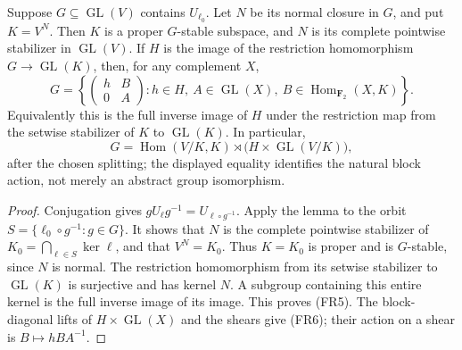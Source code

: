 \begin{proposition}
\label{prop:root-full-radical-parabolic-form}
Suppose \(G\subseteq\operatorname{GL}(V)\) contains \(U_{\ell_0}\).
Let \(N\) be its normal closure in \(G\), and put \(K=V^N\).
Then \(K\) is a proper \(G\)-stable subspace, and \(N\) is
its complete pointwise stabilizer in \(\operatorname{GL}(V)\).
If \(H\) is the image of the restriction homomorphism
\(G\to\operatorname{GL}(K)\), then, for any complement \(X\),
\[
 G=\left\{
   \begin{pmatrix}h&B\\0&A\end{pmatrix}:
   h\in H,\ A\in\operatorname{GL}(X),\
   B\in\operatorname{Hom}_{\mathbf F_2}(X,K)
       \right\}.
 \tag{FR5}
\]
Equivalently this is the full inverse image of \(H\) under the
restriction map from the setwise stabilizer of \(K\) to
\(\operatorname{GL}(K)\). In particular,
\[
 G=\operatorname{Hom}(V/K,K)\rtimes
        \bigl(H\times\operatorname{GL}(V/K)\bigr),
 \tag{FR6}
\]
after the chosen splitting; the displayed equality identifies the
natural block action, not merely an abstract group isomorphism.
\end{proposition}
\begin{proof}
Conjugation gives
\(gU_\ell g^{-1}=U_{\ell\circ g^{-1}}\).
Apply the lemma to the orbit
\(S=\{\ell_0\circ g^{-1}:g\in G\}\).
It shows that \(N\) is the complete pointwise stabilizer of
\(K_0=\bigcap_{\ell\in S}\ker\ell\), and that \(V^N=K_0\).
Thus \(K=K_0\) is proper and is \(G\)-stable, since \(N\)
is normal. The restriction homomorphism from its setwise
stabilizer to \(\operatorname{GL}(K)\) is surjective and has
kernel \(N\). A subgroup containing this entire kernel is
the full inverse image of its image. This proves (FR5).
The block-diagonal lifts of \(H\times\operatorname{GL}(X)\)
and the shears give (FR6); their action on a shear is
\(B\mapsto hBA^{-1}\).
\end{proof}

